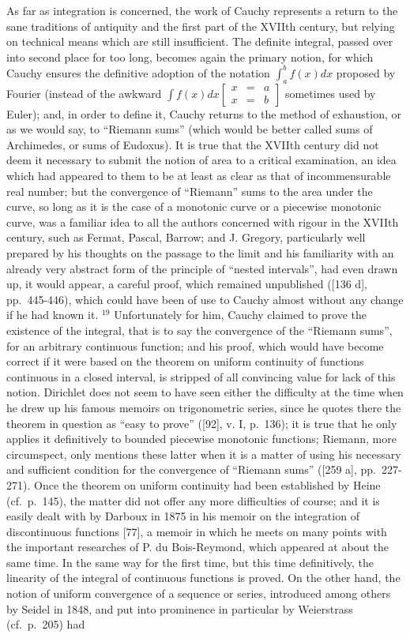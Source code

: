 As far as integration is concerned, the work of Cauchy represents a return to the sane traditions of antiquity and the first part of the XVIIth century, but relying on technical means which are still insufficient. The definite integral, passed over into second place for too long, becomes again the primary notion, for which Cauchy ensures the definitive adoption of the notation \(\int_{a}^{b} f(x) dx\) proposed by Fourier (instead of the awkward \(\int f(x) dx\left[\begin{array}{ccc}x & = & a \\ x & = & b\end{array}\right]\) sometimes used by Euler); and, in order to define it, Cauchy returns to the method of exhaustion, or as we would say, to ``Riemann sums'' (which would be better called sums of Archimedes, or sums of Eudoxus). It is true that the XVIIth century did not deem it necessary to submit the notion of area to a critical examination, an idea which had appeared to them to be at least as clear as that of incommensurable real number; but the convergence of ``Riemann'' sums to the area under the curve, so long as it is the case of a monotonic curve or a piecewise monotonic curve, was a familiar idea to all the authors concerned with rigour in the XVIIth century, such as Fermat, Pascal, Barrow; and J. Gregory, particularly well prepared by his thoughts on the passage to the limit and his familiarity with an already very abstract form of the principle of ``nested intervals'', had even drawn up, it would appear, a careful proof, which remained unpublished ({[}136 d{]}, pp.~445-446), which could have been of use to Cauchy almost without any change if he had known it. \(^{19}\) Unfortunately for him, Cauchy claimed to prove the existence of the integral, that is to say the convergence of the ``Riemann sums'', for an arbitrary continuous function; and his proof, which would have become correct if it were based on the theorem on uniform continuity of functions continuous in a closed interval, is stripped of all convincing value for lack of this notion. Dirichlet does not seem to have seen either the difficulty at the time when he drew up his famous memoirs on trigonometric series, since he quotes there the theorem in question as ``easy to prove'' ({[}92{]}, v. I, p.~136); it is true that he only applies it definitively to bounded piecewise monotonic functions; Riemann, more circumspect, only mentions these latter when it is a matter of using his necessary and sufficient condition for the convergence of ``Riemann sums'' ({[}259 a{]}, pp.~227-271). Once the theorem on uniform continuity had been established by Heine (cf.~p.~145), the matter did not offer any more difficulties of course; and it is easily dealt with by Darboux in 1875 in his memoir on the integration of discontinuous functions {[}77{]}, a memoir in which he meets on many points with the important researches of P. du Bois-Reymond, which appeared at about the same time. In the same way for the first time, but this time definitively, the linearity of the integral of continuous functions is proved. On the other hand, the notion of uniform convergence of a sequence or series, introduced among others by Seidel in 1848, and put into prominence in particular by Weierstrass (cf.~p.~205) had 